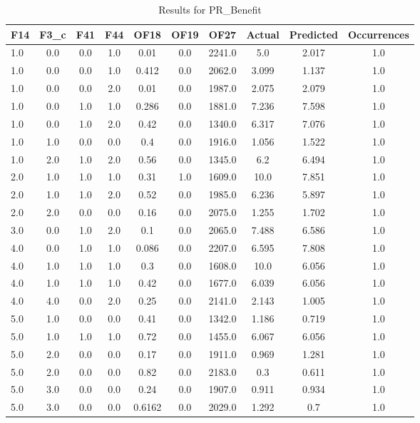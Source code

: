 \clearpage
\begin{table}[htbp]
\centering
\begin{tabular}{|l|c|c|c|c|c|c|c|c|c|}
\hline
F14 & F3_c & F41 & F44 & OF18 & OF19 & OF27 & Actual & Predicted & Occurrences \\
\hline
1.0 & 0.0 & 0.0 & 1.0 & 0.01 & 0.0 & 2241.0 & 5.0 & 2.017 & 1.0 \\
1.0 & 0.0 & 0.0 & 1.0 & 0.412 & 0.0 & 2062.0 & 3.099 & 1.137 & 1.0 \\
1.0 & 0.0 & 0.0 & 2.0 & 0.01 & 0.0 & 1987.0 & 2.075 & 2.079 & 1.0 \\
1.0 & 0.0 & 1.0 & 1.0 & 0.286 & 0.0 & 1881.0 & 7.236 & 7.598 & 1.0 \\
1.0 & 0.0 & 1.0 & 2.0 & 0.42 & 0.0 & 1340.0 & 6.317 & 7.076 & 1.0 \\
1.0 & 1.0 & 0.0 & 0.0 & 0.4 & 0.0 & 1916.0 & 1.056 & 1.522 & 1.0 \\
1.0 & 2.0 & 1.0 & 2.0 & 0.56 & 0.0 & 1345.0 & 6.2 & 6.494 & 1.0 \\
2.0 & 1.0 & 1.0 & 1.0 & 0.31 & 1.0 & 1609.0 & 10.0 & 7.851 & 1.0 \\
2.0 & 1.0 & 1.0 & 2.0 & 0.52 & 0.0 & 1985.0 & 6.236 & 5.897 & 1.0 \\
2.0 & 2.0 & 0.0 & 0.0 & 0.16 & 0.0 & 2075.0 & 1.255 & 1.702 & 1.0 \\
3.0 & 0.0 & 1.0 & 2.0 & 0.1 & 0.0 & 2065.0 & 7.488 & 6.586 & 1.0 \\
4.0 & 0.0 & 1.0 & 1.0 & 0.086 & 0.0 & 2207.0 & 6.595 & 7.808 & 1.0 \\
4.0 & 1.0 & 1.0 & 1.0 & 0.3 & 0.0 & 1608.0 & 10.0 & 6.056 & 1.0 \\
4.0 & 1.0 & 1.0 & 1.0 & 0.42 & 0.0 & 1677.0 & 6.039 & 6.056 & 1.0 \\
4.0 & 4.0 & 0.0 & 2.0 & 0.25 & 0.0 & 2141.0 & 2.143 & 1.005 & 1.0 \\
5.0 & 1.0 & 0.0 & 0.0 & 0.41 & 0.0 & 1342.0 & 1.186 & 0.719 & 1.0 \\
5.0 & 1.0 & 1.0 & 1.0 & 0.72 & 0.0 & 1455.0 & 6.067 & 6.056 & 1.0 \\
5.0 & 2.0 & 0.0 & 0.0 & 0.17 & 0.0 & 1911.0 & 0.969 & 1.281 & 1.0 \\
5.0 & 2.0 & 0.0 & 0.0 & 0.82 & 0.0 & 2183.0 & 0.3 & 0.611 & 1.0 \\
5.0 & 3.0 & 0.0 & 0.0 & 0.24 & 0.0 & 1907.0 & 0.911 & 0.934 & 1.0 \\
5.0 & 3.0 & 0.0 & 0.0 & 0.6162 & 0.0 & 2029.0 & 1.292 & 0.7 & 1.0 \\
\hline
\end{tabular}
\caption{Results for PR_Benefit}
\label{tab:PR_Benefit_results}
\end{table}

